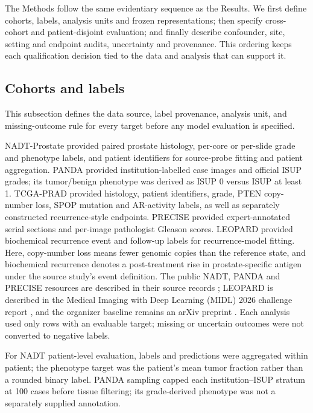 The Methods follow the same evidentiary sequence as the Results. We first define cohorts,
labels, analysis units and frozen representations; then specify cross-cohort and
patient-disjoint evaluation; and finally describe confounder, site, setting and endpoint
audits, uncertainty and provenance. This ordering keeps each qualification decision tied to
the data and analysis that can support it.

\subsection{Cohorts and labels}

This subsection defines the data source, label provenance, analysis unit, and missing-outcome
rule for every target before any model evaluation is specified.

NADT-Prostate provided paired prostate histology, per-core or per-slide grade and phenotype
labels, and patient identifiers for source-probe fitting and patient aggregation. PANDA
provided institution-labelled case images and official ISUP grades; its tumor/benign
phenotype was derived as ISUP 0 versus ISUP at least 1. TCGA-PRAD provided histology,
patient identifiers, grade, PTEN copy-number loss, SPOP mutation and AR-activity labels, as
well as separately constructed recurrence-style endpoints. PRECISE provided expert-annotated
serial sections and per-image pathologist Gleason scores. LEOPARD provided biochemical
recurrence event and follow-up labels for recurrence-model fitting. Here, copy-number loss
means fewer genomic copies than the reference state, and biochemical recurrence denotes a
post-treatment rise in prostate-specific antigen under the source study's event definition.
The public NADT,
PANDA and PRECISE resources are described in their source records
\cite{nadt2021,panda2022,precise2026}; LEOPARD is described in the Medical Imaging with Deep
Learning (MIDL) 2026 challenge
report \cite{leopard2026}, and the organizer baseline remains an arXiv preprint
\cite{grisi2026}. Each analysis used only
rows with an evaluable target; missing or uncertain outcomes were not converted to negative
labels.

For NADT patient-level evaluation, labels and predictions were aggregated within patient;
the phenotype target was the patient's mean tumor fraction rather than a rounded binary
label. PANDA sampling capped each institution--ISUP stratum at 100 cases before tissue
filtering; its grade-derived phenotype was not a separately supplied annotation.

